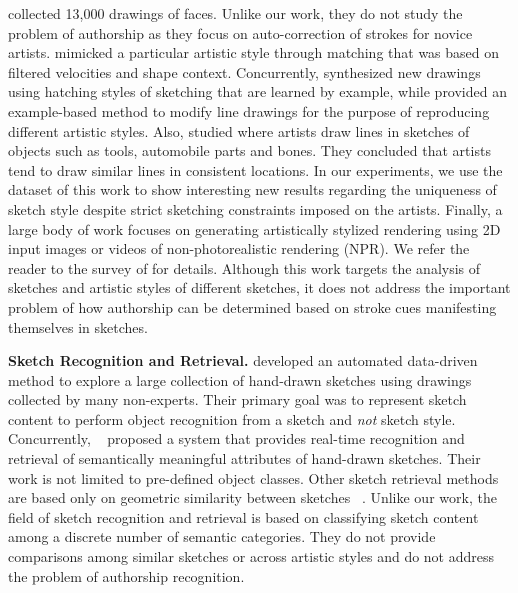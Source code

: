 \cite{Limpaecher:2013:RDA:2461912.2462016} collected 13,000 drawings of faces. Unlike our work, they do not study the problem of authorship as they focus on auto-correction of strokes for novice artists. \cite{Lu:2012:HES} mimicked a particular artistic style through matching that was based on filtered velocities and shape context. Concurrently, \cite{Kalogerakis:2012:mlhatching} synthesized new drawings using hatching styles of sketching that are learned by example, while  provided an example-based method to modify line drawings for the purpose of reproducing different artistic styles. Also,  studied where artists draw lines in sketches of objects such as tools, automobile parts and bones. They concluded that artists tend to draw similar lines in consistent locations. In our experiments, we use the dataset of this work to show interesting new results regarding the uniqueness of sketch style despite strict sketching constraints imposed on the artists. Finally, a large body of work focuses on generating artistically stylized rendering using 2D input images or videos of non-photorealistic rendering (NPR). We refer the reader to the survey of \cite{Kyprianidis:2013:TAS} for details. Although this work targets the analysis of sketches and artistic styles of different sketches, it does not address the important problem of how authorship can be determined based on stroke cues manifesting themselves in sketches. %


\noindent\textbf{Sketch Recognition and Retrieval.}
 developed an automated data-driven method to explore a large collection of hand-drawn sketches using drawings collected by many non-experts. Their primary goal was to represent sketch content to perform object recognition from a sketch and \emph{not} sketch style. Concurrently, ~\cite{Sun:2012:SAH:2393347.2396429} proposed a system that provides real-time recognition and retrieval of semantically meaningful attributes of hand-drawn sketches. Their work is not limited to pre-defined object classes. Other sketch retrieval methods are based only on geometric similarity between sketches ~\cite{Shrivastava:2011:DVS:2024156.2024188,5674030}. Unlike our work, the field of sketch recognition and retrieval is based on classifying sketch content among a discrete number of semantic categories. They do not provide comparisons among similar sketches or across artistic styles and do not address the problem of authorship recognition.

